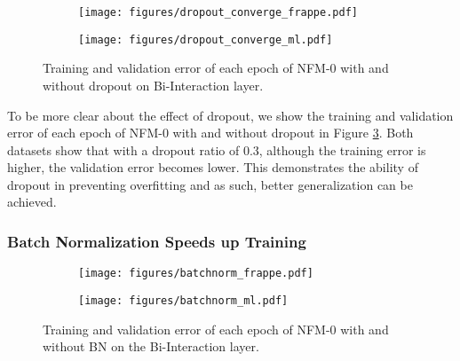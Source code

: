 \begin{figure}[t]
	\centering
	\begin{subfigure}[b]{0.22\textwidth}
		\centering
		\texttt{[image: figures/dropout\_converge\_frappe.pdf]}
		\vspace{-20pt}
\label{fig:dropout_converge_frappe}
	\end{subfigure} 
	\begin{subfigure}[b]{0.22\textwidth}
		\centering
		\texttt{[image: figures/dropout\_converge\_ml.pdf]}
		\vspace{-20pt}
\label{fig:dropout_converge_ml}
	\end{subfigure} 
	\caption{Training and validation error of each epoch of NFM-0 with and without dropout on Bi-Interaction layer.}
	\vspace{-10pt}
	\label{fig:dropout_converge}
\end{figure}

To be more clear about the effect of dropout, we show the training and validation error of each epoch of NFM-0 with and without dropout in Figure \ref{fig:dropout_converge}. Both datasets show that with a dropout ratio of 0.3, although the training error is higher, the validation error becomes lower. This demonstrates the ability of dropout in preventing overfitting and as such, better generalization can be achieved. 

\subsubsection{\textbf{Batch Normalization Speeds up Training}} 
\begin{figure}[t]
	\centering
	\begin{subfigure}[b]{0.22\textwidth}
		\centering
		\texttt{[image: figures/batchnorm\_frappe.pdf]}
		\vspace{-24pt}
\label{fig:batchnorm_frappe}
	\end{subfigure} 
	\begin{subfigure}[b]{0.22\textwidth}
		\centering
		\texttt{[image: figures/batchnorm\_ml.pdf]}
		\vspace{-24pt}
\label{fig:batchnorm_ml}
	\end{subfigure}
	\caption{Training and validation error of each epoch of NFM-0 with and without BN on the Bi-Interaction layer.}
	\vspace{-10pt}
	\label{fig:batchnorm}
\end{figure}

